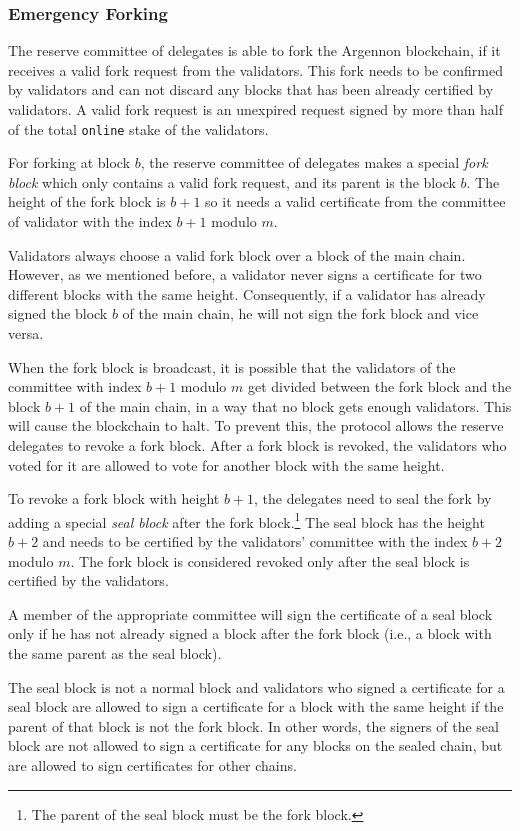 \subsubsection{Emergency Forking}

The reserve committee of delegates is able to fork the Argennon blockchain, if it receives a valid fork request
from the validators.
This fork needs to be confirmed by validators and can not discard any blocks that has been already certified
by validators.
A valid fork request is an unexpired request signed by more than half of the
total \texttt{online} stake of the validators.

For forking at block $b$, the reserve committee of delegates
makes a special \emph{fork block} which only contains a valid fork request, and its parent is the block $b$.
The height of the fork block is
$b + 1$ so it needs a valid certificate from the committee of validator with the index $b+1$ modulo $m$.

Validators always choose a valid fork block over a block of the main chain. However, as we mentioned before,
a validator never signs a certificate for two different blocks with the same height. Consequently, if a validator
has already signed the block $b$ of the main chain, he will not sign the fork block and vice versa.

When the fork block is broadcast, it is possible that the validators of the committee with index $b+1$ modulo $m$
get divided between the fork block and the block $b+1$ of the main chain, in a way that no block gets enough validators.
This will cause the blockchain to halt. To prevent this, the protocol allows the reserve delegates to revoke a
fork block. After a fork block
is revoked, the validators who voted for it are allowed to vote for another block with the same
height.

To revoke a fork block with height $b+1$, the delegates need to seal the fork by adding a special
\emph{seal block} after the fork block.\footnote{The parent of the seal block must be the fork block.} The seal block
has the height $b+2$ and needs to be certified by the validators' committee with the
index $b+2$ modulo $m$. The fork block is considered revoked only after the seal block is certified by the validators.

A member of the appropriate committee will sign the certificate of a seal block only if he has not already signed
a block after the fork block (i.e., a block with the same parent as the seal block).

The seal block is not a normal block and validators who signed a certificate for a seal block are allowed
to sign a certificate for a block with the same height if the parent of that block is not the fork
block. In other words, the signers of the seal block are not allowed to sign a certificate for
any blocks on the sealed chain, but are allowed to sign certificates for other chains.

